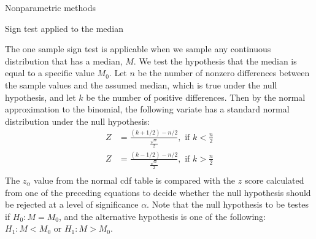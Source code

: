\documentclass[8pt]{beamer}
\renewcommand{\emph}[1]{\textcolor{myorange}{#1}}
\begin{document}
\begin{frame}{Nonparametric methods}

    \begin{block}{Sign test applied to the median}
    \end{block}
    The \alert{one sample sign test} is applicable when we sample any continuous distribution that has a \emph{median, $M$}. We test the hypothesis that the \emph{median} is equal to a specific value $M_0$. Let $n$ be the number of nonzero differences between the sample values and the assumed median, which is true under the null hypothesis, and let $k$ be the number of positive differences. Then by the \emph{normal approximation} to the \emph{binomial}, the following variate has a \emph{standard normal distribution} under the null hypothesis:
    \begin{align*}
        Z &= \frac{(k + 1/2)-n/2}{\frac{\sqrt{n}}{2}}, \text{ if } k < \frac{n}{2} \\
        Z &= \frac{(k - 1/2)-n/2}{ \frac{\sqrt{n}}{2}}, \text{ if } k > \frac{n}{2} \\
    \end{align*}
    The $z_{\alpha}$ value from the \emph{normal cdf} table is compared with the $z$ score calculated from one of the preceding equations to decide whether the \emph{null hypothesis} should be rejected at a level of significance $\alpha$. Note that the null hypothesis to be testes if $H_0 : M = M_0$, and the alternative hypothesis is one of the following: $H_1 : M < M_0$ or $H_1 : M > M_0$. 
    \end{frame}
\end{document}
